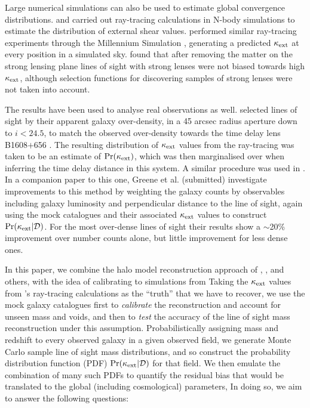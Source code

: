 \documentclass[useAMS,usenatbib,a4paper]{mn2e}
\begin{document}
Large numerical simulations can also be used to estimate global convergence
distributions. \citet{Holder+Schechter2003} and \citet{DalalEtal2005} carried
out ray-tracing calculations in N-body simulations \citep{KauffmannEtal1999,WambsganssEtal2004} to estimate the
distribution of external shear values.  \citet{HilbertEtal2009} performed
similar ray-tracing experiments through the Millennium Simulation
\citep{SpringelEtal2005}, generating a predicted $\kappa_{\rm ext}$ at every position
in a simulated sky. \citet{HilbertEtal2009} found that after removing the
matter on the strong lensing plane \MS lines of sight with strong lenses were
not biased towards high $\kappa_{\rm ext}$, although selection functions for
discovering samples of strong lenses were not taken into account.

The \MS results have been used to analyse real observations as well. 
\citet{SuyuEtal2010} selected \MS lines of sight by their apparent
galaxy over-density, in a 45 arcsec radius aperture down to $i < 24.5$,
to match the observed over-density towards the time delay lens
B1608$+$656 \citep{FassnachtEtal2011}.  The resulting distribution of
$\kappa_{\rm ext}$ values from the ray-tracing was taken to be an estimate of 
$\Pr(\kappa_{\rm ext})$, which was then marginalised over when inferring the time
delay distance in this system. A similar procedure was used in \citet{SuyuEtal2012}.
In a companion paper to this one, Greene et al. (submitted) investigate
improvements to this method by weighting the galaxy counts by observables
including galaxy luminosity and perpendicular distance to the line of sight, again using the
\MS mock catalogues and their associated $\kappa_{\rm ext}$ values to construct
$\Pr(\kappa_{\rm ext}|{\mathcal{D}})$. For the most over-dense lines of sight their
results  show a $\sim$20\% improvement over
number counts alone, but little improvement for less dense ones.


In this paper, we combine the halo model reconstruction approach of
\citet{GunnarssonEtal2006}, \citet{JonssonEtal2010}, 
\citet{WongEtal2011} and others, with the
idea of calibrating to simulations from \citet{SuyuEtal2010}
Taking the $\kappa_{\rm ext}$ values from
\citet{HilbertEtal2009}'s ray-tracing calculations as the ``truth''
that we have to recover, we use the \MS mock galaxy catalogues first to
{\it calibrate} the reconstruction and account for unseen mass and
voids, and then to {\it test} the accuracy of the line of sight mass
reconstruction under this assumption. Probabilistically assigning mass
and redshift to every observed galaxy in a given observed field, we
generate Monte Carlo sample line of sight mass distributions, and so
construct the probability distribution function (PDF) $\Pr(\kappa_{\rm ext}|{\mathcal{D}})$ for that field.
We then emulate
the combination of many such PDFs to quantify the residual bias that
would be translated to the global (including cosmological) parameters, 
In doing so, we aim to answer the following questions: 
\end{document}
